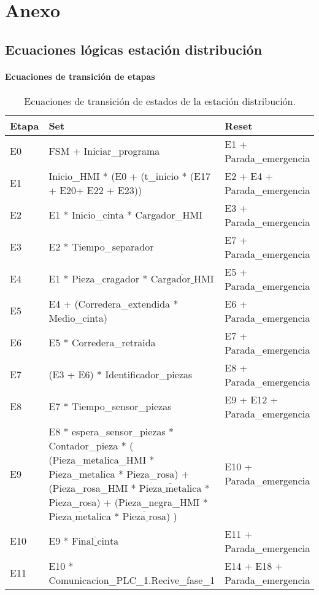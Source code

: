 \chapter{Anexo}
\label{cap:anexo}

\section{Ecuaciones lógicas estación distribución}
\label{sec:anexo_distribucion}

\subsubsection{Ecuaciones de transición de etapas}

\begin{table}[H]
\begin{center}

\renewcommand{\arraystretch}{1.5}
\begin{tabular}{|M{1.5cm}|M{6cm}|M{6cm}|}
\hline
\textbf{Etapa} & 
\textbf{Set} & 
\textbf{Reset} \\
\hline
E0  &  FSM + Iniciar\_programa & E1 + Parada\_emergencia \\
\hline
E1  &  Inicio\_HMI * (E0 + (t\_inicio  * (E17 + E20+ E22 + E23)) & E2 + E4 + Parada\_emergencia  \\
\hline
E2  &  E1 * Inicio\_cinta * Cargador\_HMI & E3 + Parada\_emergencia \\
\hline
E3  &  E2 * Tiempo\_separador & E7 + Parada\_emergencia \\
\hline
E4  &  E1 * Pieza\_cragador * $\overline{\text{Cargador\_HMI}}$ & E5 + Parada\_emergencia \\
\hline
E5  &  E4 + (Corredera\_extendida * Medio\_cinta) & E6 + Parada\_emergencia \\
\hline
E6  &  E5 * Corredera\_retraida & E7 + Parada\_emergencia \\
\hline
E7  &  (E3 + E6) * Identificador\_piezas & E8 + Parada\_emergencia \\
\hline
E8  &  E7 * Tiempo\_sensor\_piezas & E9 + E12 + Parada\_emergencia \\
\hline
E9 & 
E8 * espera\_sensor\_piezas * Contador\_pieza * 
( (Pieza\_metalica\_HMI * Pieza\_metalica * Pieza\_rosa) + 
(Pieza\_rosa\_HMI * $\overline{\text{Pieza\_metalica}}$ * Pieza\_rosa) + 
(Pieza\_negra\_HMI * $\overline{\text{Pieza\_metalica}}$ * $\overline{\text{Pieza\_rosa}}$) )
 & E10 + Parada\_emergencia \\
\hline
E10  &  E9 * $\overline{\text{Final\_cinta}}$ & E11 + Parada\_emergencia \\
\hline
E11  &  E10 * Comunicacion\_PLC\_1.Recive\_fase\_1 & E14 + E18 + Parada\_emergencia \\
\hline

\end{tabular}

\caption{Ecuaciones de transición de estados de la estación distribución.}
\label{cuadro:transiciones_distribucion_1}
\end{center}
\end{table}

